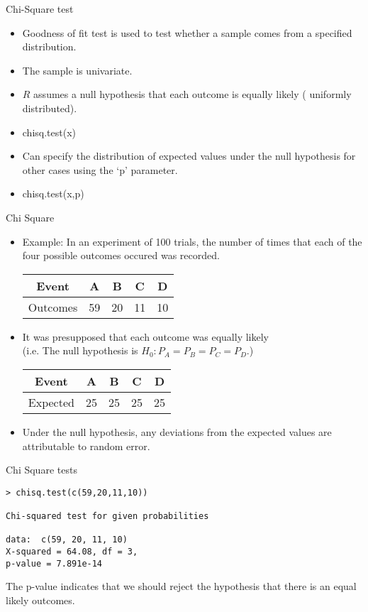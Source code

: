 \documentclass[pdf,default,slideColor,colorBG]{prosper}
\begin{document}
\begin{slide}{Chi-Square test}
\begin{itemize}
\item Goodness of fit test is used to test whether a sample comes from a specified distribution.
\item The sample is univariate.
\item $R$ assumes a null hypothesis that each outcome is equally likely ( uniformly distributed).
\item chisq.test(x)
\item Can specify the distribution of expected values under the null hypothesis for other cases using the `p' parameter.
\item chisq.test(x,p)
\end{itemize}
\end{slide}
\begin{slide}{Chi Square}
\begin{itemize}
\item Example: In an experiment of 100 trials, the number of times that each of the four possible outcomes
occured was recorded.\\
\begin{tabular}{|c|c|c|c|c|}
\hline
  Event & A & B & C & D \\\hline
  Outcomes & 59 & 20 & 11 & 10 \\
  \hline
\end{tabular}

\item It was presupposed that each outcome was equally likely \\(i.e. The null hypothesis is $H_{0} : P_{A} = P_{B} = P_{C} = P_{D}$.)\\
\begin{tabular}{|c|c|c|c|c|}
\hline
  Event & A & B & C & D \\\hline
  Expected & 25 & 25 & 25 & 25 \\
  \hline
\end{tabular}
\item Under the null hypothesis, any deviations from the expected values are attributable to random error.

\end{itemize}
\end{slide}
\begin{slide}{Chi Square tests}


\begin{verbatim}
> chisq.test(c(59,20,11,10))

Chi-squared test for given probabilities

data:  c(59, 20, 11, 10)
X-squared = 64.08, df = 3,
p-value = 7.891e-14
\end{verbatim}

The p-value indicates that we should reject the hypothesis that there is an equal likely outcomes.

\end{slide}
\end{document}
